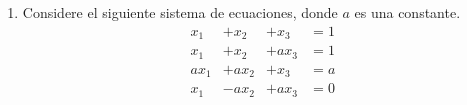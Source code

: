 \documentclass[12pt]{article}
\newenvironment{solucion}
{\begin{mdframed}[backgroundcolor=black!10]
		{\bf Solución:}\\
	}
	{
	\end{mdframed}
}
\newenvironment{preguntas}
{\begin{enumerate}\itemsep12pt
	}
	{
	\end{enumerate}
}
\newcommand{\ra}{\rightarrow}
\begin{document}
\begin{preguntas}
\begin{solucion}
\begin{enumerate}[a)]
$$\begin{array}{rcl}
			0 & = & 0
			\end{array} \ra \begin{array}{rcl}
			x_1 & = & -1 + \frac{4}{3}x_3\\
			x_2 & = & 2\\
			x_3 & = & x_3
			\end{array}$$
			$$ x = \begin{pmatrix}
			-1 + \frac{4}{3}x_3\\
			2\\
			x_3
			\end{pmatrix} = \begin{pmatrix}
			-1\\2\\0
			\end{pmatrix} + x_3\begin{pmatrix}
			\frac{4}{3}\\
			0\\
			1
			\end{pmatrix}$$
			Luego, la solución del sistema $Ax = b$ es
			$$S = \begin{pmatrix}
			-1\\2\\0
			\end{pmatrix} + Gen\left\{\begin{pmatrix}
			\frac{4}{3}\\
			0\\
			1
			\end{pmatrix}\right\}$$
			Finalmente, podriamos amplificar el vector del generado por 3, para que quede más bonito, con lo que
			$$S = \begin{pmatrix}
			-1\\2\\0
			\end{pmatrix} + Gen\left\{\begin{pmatrix}
			4\\
			0\\
			3
			\end{pmatrix}\right\}$$
\end{enumerate}
\end{solucion}
\item Considere el siguiente sistema de ecuaciones, donde $a$ es una constante.
  $$\begin{array}{llll}
   x_1&+x_2&+x_3&=1 \\
    x_1&+x_2&+ax_3&=1 \\
     ax_1&+ax_2&+x_3&=a\\
      x_1&-ax_2&+ax_3&=0  
  \end{array}$$

\end{preguntas}
\end{document}
